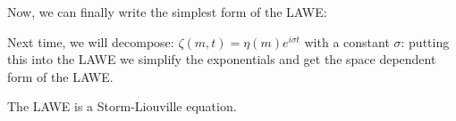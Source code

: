 \documentclass[main.tex]{subfiles}
\begin{document}
Now, we can finally write the simplest form of the LAWE:
%
%

Next time, we will decompose: \(\zeta(m, t) = \eta(m) e^{i \sigma t}\) with a constant \(\sigma\): putting this into the LAWE we simplify the exponentials and get the space dependent form of the LAWE.

The LAWE is a Storm-Liouville equation.
\end{document}

